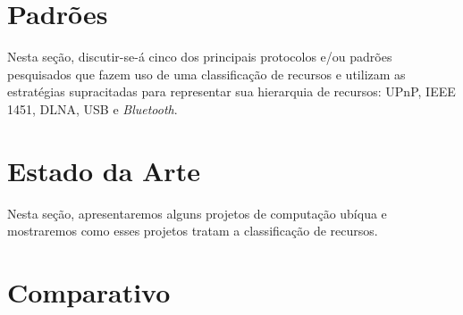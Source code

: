 \section{Padrões}

Nesta seção, discutir-se-á cinco dos principais protocolos e/ou padrões pesquisados que fazem uso de uma classificação de recursos e utilizam as estratégias supracitadas para representar sua hierarquia de recursos: UPnP, IEEE 1451, DLNA, USB e \emph{Bluetooth}.







\section{Estado da Arte}
Nesta seção, apresentaremos alguns projetos de computação ubíqua e mostraremos como esses projetos tratam a classificação de recursos.





\section{Comparativo}
